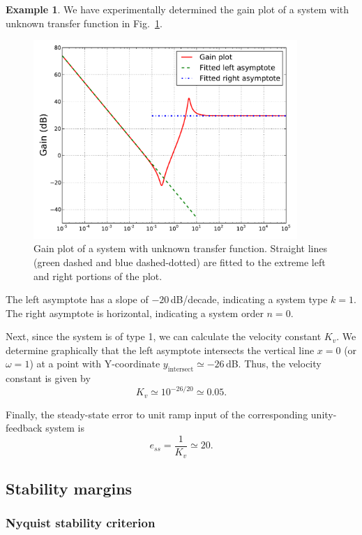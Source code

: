 \documentclass[a4paper,11pt]{report}
\theoremstyle{definition}
\newtheorem{mdexample}{Example}
\newenvironment{example}%
  {\vspace{0.1cm}\begin{mdframed}[backgroundcolor=lightgray]\begin{mdexample}}%
  {\end{mdexample}\end{mdframed}\vspace{0.1cm}}
\begin{document}
\begin{example}
  \label{ex:bode-type1}
  We have experimentally determined the gain plot of a system with
  unknown transfer function in Fig.~\ref{fig:bode-type1}.
  \begin{figure}[H]
    \centering
    \includegraphics[width=10cm]{fig/bode-type1.pdf}
    \caption{Gain plot of a system with unknown transfer
      function. Straight lines (green dashed and blue dashed-dotted)
      are fitted to the extreme left and right portions of the plot.}
    \label{fig:bode-type1}
  \end{figure}

  The left asymptote has a slope of $-20$\,dB/decade, indicating a
  system type $k=1$. The right asymptote is horizontal, indicating a
  system order $n=0$.

  Next, since the system is of type 1, we can calculate the velocity
  constant $K_v$. We determine graphically that the left asymptote
  intersects the vertical line $x=0$ (or $\omega=1$) at a point with
  Y-coordinate $y_\mathrm{intersect}\simeq -26$\,dB. 
  Thus, the velocity constant is given by
  \[
  K_v \simeq 10^{-26/20}  \simeq 0.05.
  \]

  Finally, the steady-state error to unit ramp input of the
  corresponding unity-feedback system is
  \[
  e_{ss} = \frac{1}{K_v} \simeq 20.
  \]
\end{example}

\subsection{Stability margins}
\label{sec:margins}

\subsubsection{Nyquist stability criterion}
\end{document}
